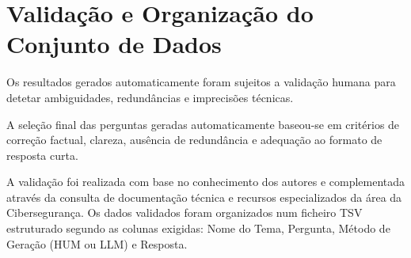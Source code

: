 \section{Validação e Organização do Conjunto de Dados}
Os resultados gerados automaticamente foram sujeitos a validação humana para detetar ambiguidades, redundâncias e imprecisões técnicas.

A seleção final das perguntas geradas automaticamente baseou-se em critérios de correção factual, clareza, ausência de redundância e adequação ao formato de resposta curta. 

A validação foi realizada com base no conhecimento dos autores e complementada através da consulta de documentação técnica e recursos especializados da área da Cibersegurança\cite{chen_attacks_2024, stallings_cryptography_2017}.
Os dados validados foram organizados num ficheiro TSV estruturado segundo as colunas exigidas: Nome do Tema, Pergunta, Método de Geração (HUM ou LLM) e Resposta.